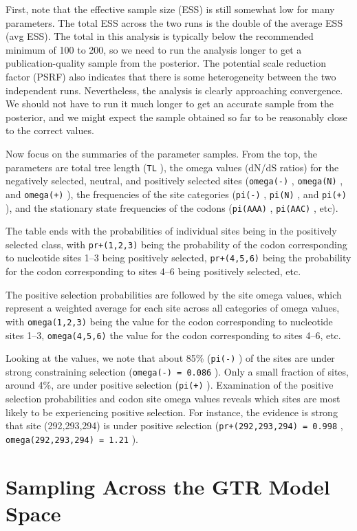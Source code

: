 \documentclass[12pt]{book}
\newcommand{\ttt}[1]{\texttt{#1} }
\begin{document}
First, note that the effective sample size (ESS) is still somewhat low for many parameters. The total ESS
across the two runs is the double of the average ESS (avg ESS). The total in this analysis is typically below
the recommended minimum of 100 to 200, so we need to run the analysis longer to get a publication-quality
sample from the posterior. The potential scale reduction factor (PSRF) also indicates that there is some
heterogeneity between the two independent runs. Nevertheless, the analysis is clearly approaching
convergence. We should not have to run it much longer to get an accurate sample from the
posterior, and we might expect the sample obtained so far to be reasonably close to the correct values.

Now focus on the summaries of the parameter samples. From the top, the parameters are
total tree length (\ttt{TL}), the omega values (dN/dS ratios) for the negatively selected, neutral, and
positively selected sites (\ttt{omega(-)}, \ttt{omega(N)}, and \ttt{omega(+)}), the frequencies of the site categories
(\ttt{pi(-)}, \ttt{pi(N)}, and \ttt{pi(+)}), and the stationary state frequencies of the codons (\ttt{pi(AAA)}, 
\ttt{pi(AAC)}, etc).

The table ends with the probabilities of individual sites being in the positively selected class, with
\ttt{pr+(1,2,3)} being the probability of the codon corresponding to nucleotide sites 1--3 being positively
selected, \ttt{pr+(4,5,6)} being the probability for the codon corresponding to sites 4--6 being
positively selected, etc.

The positive selection probabilities are followed by the site omega values, which represent a weighted
average for each site across all categories of omega values, with \ttt{omega(1,2,3)} being the value for the codon
corresponding to nucleotide sites 1--3, \ttt{omega(4,5,6)} the value for the codon corresponding to sites
4--6, etc.

Looking at the values, we note that about 85\% (\ttt{pi(-)}) of the sites are under strong constraining selection
(\ttt{omega(-) = 0.086}). Only a small fraction of sites, around 4\%, are under positive selection (\ttt{pi(+)}).
Examination of the positive selection probabilities and codon site omega values reveals which sites
are most likely to be experiencing positive selection. For instance, the evidence is strong that site (292,293,294)
is under positive selection (\ttt{pr+(292,293,294) = 0.998}, \ttt{omega(292,293,294) = 1.21}).

\section{Sampling Across the GTR Model Space}
\end{document}
